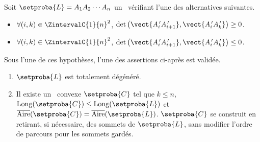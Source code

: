 \begin{fact} \label{conv-from-non-neg-det}
    Soit $\setproba{L} = A_1 A_2 \cdots A_n$ un \ncycle\ vérifiant l'une des alternatives suivantes.
	\begin{itemize}
		\item $\forall (i, k) \in \ZintervalC{1}{n}^2$,
		$\det \big( \vect{\primeit{A}_i \primeit{A}_{i+1}}, \vect{\primeit{A}_i \primeit{A}_k} \big) \geq 0$.

		\item $\forall (i, k) \in \ZintervalC{1}{n}^2$,
		$\det \big( \vect{\primeit{A}_i \primeit{A}_{i+1}}, \vect{\primeit{A}_i \primeit{A}_k} \big) \leq 0$.
    \end{itemize}
    
    Sous l'une de ces hypothèses, l'une des assertions ci-après est validée.
	\begin{enumerate}[label=\roman*.]
		\item $\setproba{L}$ est totalement dégénéré.

		\item Il existe un \kgone\ convexe $\setproba{C}$ tel que
		$k \leq n$, 
		$\cyclelen{\setproba{C}} \leq \cyclelen{\setproba{L}}$
		et
		$\sarea{\setproba{C}} = \sarea{\setproba{L}}$.
		$\setproba{C}$ se construit en retirant, si nécessaire, des sommets de $\setproba{L}$, sans modifier l'ordre de parcours pour les sommets gardés.
    \end{enumerate}
\end{fact}


